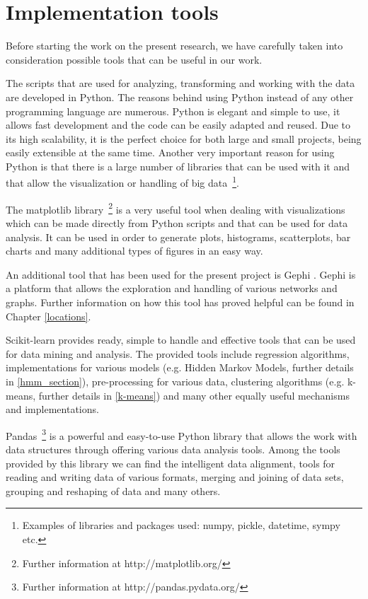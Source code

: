 \section{Implementation tools}
Before starting the work on the present research, we have carefully taken into
consideration possible tools that can be useful in our work.

The scripts that are used for analyzing, transforming and working with the data
are developed in Python. The reasons behind using Python instead of any other
programming language are numerous. Python is elegant and simple to use, it
allows fast development and the code can be easily adapted and reused. Due to
its high scalability, it is the perfect choice for both large and small
projects, being easily extensible at the same time. Another very important
reason for using Python is that there is a large number of libraries that can be
used with it and that allow the visualization or handling of big
data~\footnote{Examples of libraries and packages used: numpy, pickle,
datetime, sympy etc.}.

The matplotlib library~\footnote{Further information at http://matplotlib.org/}
is a very useful tool when dealing with visualizations which can be made
directly from Python scripts and that can be used for data analysis. It can be
used in order to generate plots, histograms, scatterplots, bar charts and many
additional types of figures in an easy way.

An additional tool that has been used for the present project is Gephi
\cite{Gephi}. Gephi is a platform that allows the exploration and handling of
various networks and graphs. Further information on how this tool has proved
helpful can be found in Chapter \ref{locations}.

Scikit-learn \cite{Scikit} provides ready, simple to handle and effective tools that
can be used for data mining and analysis. The provided tools include regression
algorithms, implementations for various models (e.g. Hidden Markov Models,
further details in \ref{hmm_section}), pre-processing for various data,
clustering algorithms (e.g. k-means, further details in \ref{k-means}) and many
other equally useful mechanisms and implementations.

Pandas~\footnote{Further information at http://pandas.pydata.org/} is a powerful
and easy-to-use Python library that allows the work with data structures through
offering various data analysis tools. Among the tools provided by this library
we can find the intelligent data alignment, tools for reading and writing data
of various formats, merging and joining of data sets, grouping and reshaping of
data and many others.
